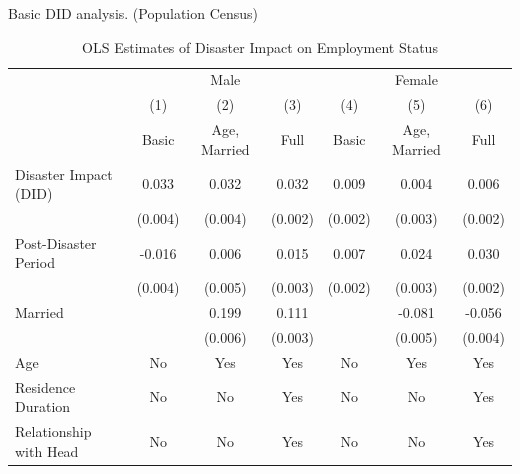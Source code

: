 \documentclass[serif, aspectratio=169]{beamer}
\begin{document}
\begin{frame}

Basic DID analysis. (Population Census)


\begin{table}[htbp]
\centering
\caption{OLS Estimates of Disaster Impact on Employment Status}

\begin{tabular}{@{}l*{6}{c}@{}}
          &\multicolumn{3}{c}{Male}                                &\multicolumn{3}{c}{Female}                              \\\cmidrule(lr){2-4}\cmidrule(lr){5-7}
          &\multicolumn{1}{c}{(1)}&\multicolumn{1}{c}{(2)}&\multicolumn{1}{c}{(3)}&\multicolumn{1}{c}{(4)}&\multicolumn{1}{c}{(5)}&\multicolumn{1}{c}{(6)}\\
          &\multicolumn{1}{c}{Basic}&\multicolumn{1}{c}{Age, Married}&\multicolumn{1}{c}{Full}&\multicolumn{1}{c}{Basic}&\multicolumn{1}{c}{Age, Married}&\multicolumn{1}{c}{Full}\\
\toprule
Disaster Impact (DID)&    0.033\sym{***}&    0.032\sym{***}&    0.032\sym{***}&    0.009\sym{***}&    0.004         &    0.006\sym{***}\\
          &  (0.004)         &  (0.004)         &  (0.002)         &  (0.002)         &  (0.003)         &  (0.002)         \\
\addlinespace
Post-Disaster Period&   -0.016\sym{***}&    0.006         &    0.015\sym{***}&    0.007\sym{***}&    0.024\sym{***}&    0.030\sym{***}\\
          &  (0.004)         &  (0.005)         &  (0.003)         &  (0.002)         &  (0.003)         &  (0.002)         \\
\addlinespace
Married   &                  &    0.199\sym{***}&    0.111\sym{***}&                  &   -0.081\sym{***}&   -0.056\sym{***}\\
          &                  &  (0.006)         &  (0.003)         &                  &  (0.005)         &  (0.004)         \\
\midrule
Age       &       No         &      Yes         &      Yes         &       No         &      Yes         &      Yes         \\
Residence Duration&       No         &       No         &      Yes         &       No         &       No         &      Yes         \\
Relationship with Head&       No         &       No         &      Yes         &       No         &       No         &      Yes         \\

\end{tabular}
\end{table}
\end{frame}
\end{document}
